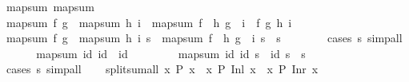 \begin{isabellebody}
\isanewline
{}\isamarkupfalse%
\ map{\isacharunderscore}{\kern0pt}sum{\isacharcolon}{\kern0pt}\ map{\isacharunderscore}{\kern0pt}sum\isanewline
%
\isadelimproof
%
\endisadelimproof
%
\isatagproof
{}\isamarkupfalse%
\ {\isacharminus}{\kern0pt}\isanewline
\ \ \isamarkupfalse%
\ {\isachardoublequoteopen}map{\isacharunderscore}{\kern0pt}sum\ f\ g\ {\isasymcirc}\ map{\isacharunderscore}{\kern0pt}sum\ h\ i\ {\isacharequal}{\kern0pt}\ map{\isacharunderscore}{\kern0pt}sum\ {\isacharparenleft}{\kern0pt}f\ {\isasymcirc}\ h{\isacharparenright}{\kern0pt}\ {\isacharparenleft}{\kern0pt}g\ {\isasymcirc}\ i{\isacharparenright}{\kern0pt}{\isachardoublequoteclose}\ \ f\ g\ h\ i\isanewline
\ \ \isamarkupfalse%
\isanewline
\ \ \ \ \isamarkupfalse%
\ {\isachardoublequoteopen}{\isacharparenleft}{\kern0pt}map{\isacharunderscore}{\kern0pt}sum\ f\ g\ {\isasymcirc}\ map{\isacharunderscore}{\kern0pt}sum\ h\ i{\isacharparenright}{\kern0pt}\ s\ {\isacharequal}{\kern0pt}\ map{\isacharunderscore}{\kern0pt}sum\ {\isacharparenleft}{\kern0pt}f\ {\isasymcirc}\ h{\isacharparenright}{\kern0pt}\ {\isacharparenleft}{\kern0pt}g\ {\isasymcirc}\ i{\isacharparenright}{\kern0pt}\ s{\isachardoublequoteclose}\ \ s\isanewline
\ \ \ \ \ \ \isamarkupfalse%
\ {\isacharparenleft}{\kern0pt}cases\ s{\isacharparenright}{\kern0pt}\ simp{\isacharunderscore}{\kern0pt}all\isanewline
\ \ \isamarkupfalse%
\isanewline
\ \ \isamarkupfalse%
\ {\isachardoublequoteopen}map{\isacharunderscore}{\kern0pt}sum\ id\ id\ {\isacharequal}{\kern0pt}\ id{\isachardoublequoteclose}\isanewline
\ \ \isamarkupfalse%
\isanewline
\ \ \ \ \isamarkupfalse%
\ {\isachardoublequoteopen}map{\isacharunderscore}{\kern0pt}sum\ id\ id\ s\ {\isacharequal}{\kern0pt}\ id\ s{\isachardoublequoteclose}\ \ s\isanewline
\ \ \ \ \ \ \isamarkupfalse%
\ {\isacharparenleft}{\kern0pt}cases\ s{\isacharparenright}{\kern0pt}\ simp{\isacharunderscore}{\kern0pt}all\isanewline
\ \ \isamarkupfalse%
\isanewline
{}\isamarkupfalse%
%
\endisatagproof
{\isafoldproof}%
%
\isadelimproof
\isanewline
%
\endisadelimproof
\isanewline
{}\isamarkupfalse%
\ split{\isacharunderscore}{\kern0pt}sum{\isacharunderscore}{\kern0pt}all{\isacharcolon}{\kern0pt}\ {\isachardoublequoteopen}{\isacharparenleft}{\kern0pt}{\isasymforall}x{\isachardot}{\kern0pt}\ P\ x{\isacharparenright}{\kern0pt}\ {\isasymlongleftrightarrow}\ {\isacharparenleft}{\kern0pt}{\isasymforall}x{\isachardot}{\kern0pt}\ P\ {\isacharparenleft}{\kern0pt}Inl\ x{\isacharparenright}{\kern0pt}{\isacharparenright}{\kern0pt}\ {\isasymand}\ {\isacharparenleft}{\kern0pt}{\isasymforall}x{\isachardot}{\kern0pt}\ P\ {\isacharparenleft}{\kern0pt}Inr\ x{\isacharparenright}{\kern0pt}{\isacharparenright}{\kern0pt}{\isachardoublequoteclose}\isanewline

\end{isabellebody}
